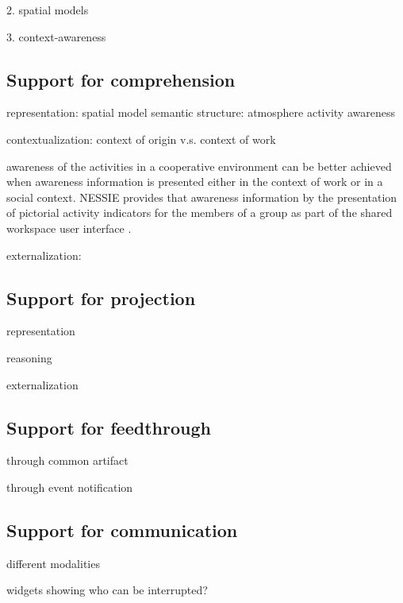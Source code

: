 2. spatial models

3. context-awareness


\subsection{Support for comprehension} %
\label{sub:support_for_comprehension}
representation:
spatial model
semantic structure: atmosphere
activity awareness

contextualization: 
context of origin v.s. context of work

awareness of the activities in a cooperative environment can be better achieved when awareness information is presented either in the context of work or in a social context. NESSIE provides that awareness information by the presentation of pictorial activity indicators for the members of a group as part of the shared workspace user interface \cite{prinz1999a}.


externalization:


\subsection{Support for projection} %
\label{sub:support_for_projection}
representation

reasoning

externalization


\subsection{Support for feedthrough} %
\label{sub:support_for_feedthrough}
through common artifact

through event notification


\subsection{Support for communication} %
\label{sub:support_for_communication}
different modalities

widgets showing who can be interrupted?


